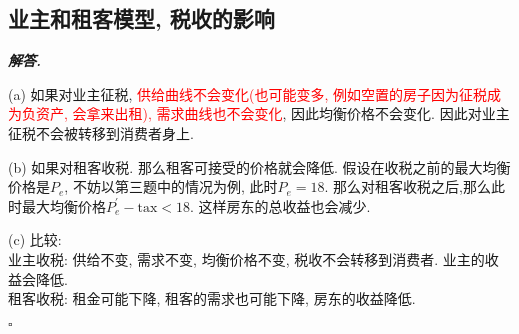 \documentclass[10pt, a4paper, oneside]{ctexart}
\newenvironment{solution}{%
  \par\noindent\textbf{\textit{解答. }}\ignorespaces
}{%
  \hfill\ensuremath{\square}\par %
}
\begin{document}
\subsection{业主和租客模型, 税收的影响}

\begin{solution}
(a) 如果对业主征税, \textcolor{red}{供给曲线不会变化(也可能变多, 例如空置的房子因为征税成为负资产, 会拿来出租), 需求曲线也不会变化}, 因此均衡价格不会变化. 因此对业主征税不会被转移到消费者身上.

(b) 如果对租客收税. 那么租客可接受的价格就会降低. 假设在收税之前的最大均衡价格是$P_{e}$, 不妨以第三题中的情况为例, 此时$P_{e}=18$. 那么对租客收税之后,那么此时最大均衡价格$P_{e}^{\prime}-\text{tax}<18$. 这样房东的总收益也会减少.

(c) 比较:\\
业主收税: 供给不变, 需求不变, 均衡价格不变, 税收不会转移到消费者. 业主的收益会降低.\\
租客收税: 租金可能下降, 租客的需求也可能下降, 房东的收益降低.


\end{solution}
\end{document}
